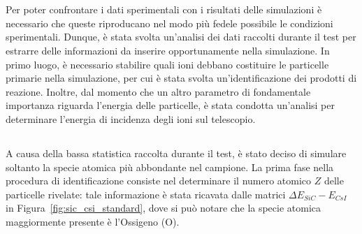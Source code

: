 \section{}

Per poter confrontare i dati sperimentali con i risultati delle simulazioni è necessario che queste riproducano nel modo più fedele possibile le condizioni sperimentali.
Dunque, è stata svolta un'analisi dei dati raccolti durante il test per estrarre delle informazioni da inserire opportunamente nella simulazione.
In primo luogo, è necessario stabilire quali ioni debbano costituire le particelle primarie nella simulazione, per cui è stata svolta un'identificazione dei prodotti di reazione.
Inoltre, dal momento che un altro parametro di fondamentale importanza riguarda l'energia delle particelle, è stata condotta un'analisi per determinare l'energia di incidenza degli ioni sul telescopio.



\subsection{}

A causa della bassa statistica raccolta durante il test, è stato deciso di simulare soltanto la specie atomica più abbondante nel campione.
La prima fase nella procedura di identificazione consiste nel determinare il numero atomico $Z$ delle particelle rivelate: tale informazione è stata ricavata dalle matrici $\Delta E_{SiC} - E_{CsI}$ in Figura~\ref{fig:sic_csi_standard}, dove si può notare che la specie atomica maggiormente presente è l'Ossigeno (O). 

